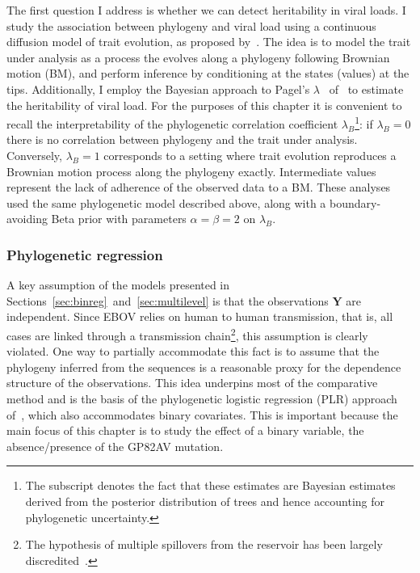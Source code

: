 The first question I address is whether we can detect heritability in viral loads.
I study the association between phylogeny and viral load using a continuous diffusion model of trait evolution, as proposed by~\cite{Lemey2010}.
The idea is to model the trait under analysis as a process the evolves along a phylogeny following Brownian motion (BM), and perform inference by conditioning at the states (values) at the tips.
Additionally, I employ the Bayesian approach to Pagel's $\lambda$~\citep{Pagel1999} of~\cite{Vrancken2015} to estimate the heritability of viral load.
For the purposes of this chapter it is convenient to recall the interpretability of the phylogenetic correlation coefficient $\lambda_B$\footnote{The subscript denotes the fact that these estimates are Bayesian estimates derived from the posterior distribution of trees and hence accounting for phylogenetic uncertainty.}: if $\lambda_B = 0$ there is no correlation between phylogeny and the trait under analysis.
Conversely, $\lambda_B = 1$ corresponds to a setting where trait evolution reproduces a Brownian motion process along the phylogeny exactly.
Intermediate values represent the lack of adherence of the observed data to a BM.
These analyses used the same phylogenetic model described above, along with a boundary-avoiding Beta prior with parameters $\alpha = \beta = 2$ on $\lambda_B$.

\subsubsection{Phylogenetic regression}
\label{sec:phyloreg}

A key assumption of the models presented in Sections~\ref{sec:binreg}~and~\ref{sec:multilevel} is that the observations $\boldsymbol Y$ are independent.
Since EBOV relies on human to human transmission, that is, all cases are linked through a transmission chain\footnote{The hypothesis of multiple spillovers from the reservoir has been largely discredited~\citep{Baize2014, Gire2014}.}, this assumption is clearly violated.
One way to partially accommodate this fact is to assume that the phylogeny inferred from the sequences is a reasonable proxy for the dependence structure of the observations.
This idea underpins most of the comparative method and is the basis of the phylogenetic logistic regression (PLR) approach of~\cite{Ives2009}, which also accommodates binary covariates.
This is important because the main focus of this chapter is to study the effect of a binary variable, the absence/presence of the GP82AV mutation.

